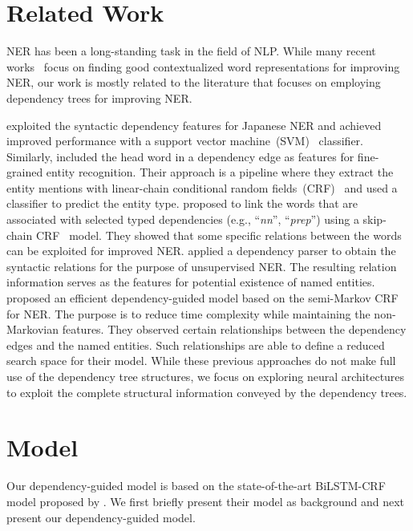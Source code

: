 \documentclass[11pt,a4paper]{article}
\begin{document}
\section{Related Work}
NER has been a long-standing task in the field of NLP. 
While many recent works~\cite{peters2018deep,akbik2018coling,devlin2019bert} focus on finding good contextualized word representations for improving NER, our work is mostly related to the literature that focuses on employing dependency trees for improving NER. 


\citet{sasano2008japanese} exploited the syntactic dependency features for Japanese NER and achieved improved performance with a support vector machine~(SVM)~\cite{cortes1995support} classifier. 
Similarly, \citet{ling2012fine} included the head word in a dependency edge as features for fine-grained entity recognition. 
Their approach is a pipeline where they extract the entity mentions with  linear-chain conditional random fields~(CRF)~\cite{lafferty2001conditional} and used a classifier to predict the entity type.
\citet{liu2010recognizing} proposed to link the words that are associated with selected typed dependencies (e.g., ``{\it nn}'', ``{\it prep}'') using a skip-chain CRF~\cite{sutton2004collective} model. 
They showed that some specific relations between the words can be exploited for improved NER. 
\citet{cucchiarelli2001unsupervised} applied a dependency parser to obtain the syntactic relations for the purpose of unsupervised NER. 
The resulting relation information serves as the features for potential existence of named entities. 
\citet{jie2017efficient} proposed an efficient dependency-guided model based on the semi-Markov CRF~\cite{sarawagi2004semi} for NER. 
The purpose is to reduce time complexity while maintaining the non-Markovian features.
They observed certain relationships between the dependency edges and the named entities. 
Such relationships are able to define a reduced search space for their model. 
While these previous approaches do not make full use of the dependency tree structures, we focus on exploring neural architectures to exploit the  complete structural information conveyed by the dependency trees.








\section{Model}

Our dependency-guided model is based on the state-of-the-art BiLSTM-CRF model proposed by \citet{lample2016neural}.
We first briefly present their model  as background and next present our dependency-guided model.
\end{document}
